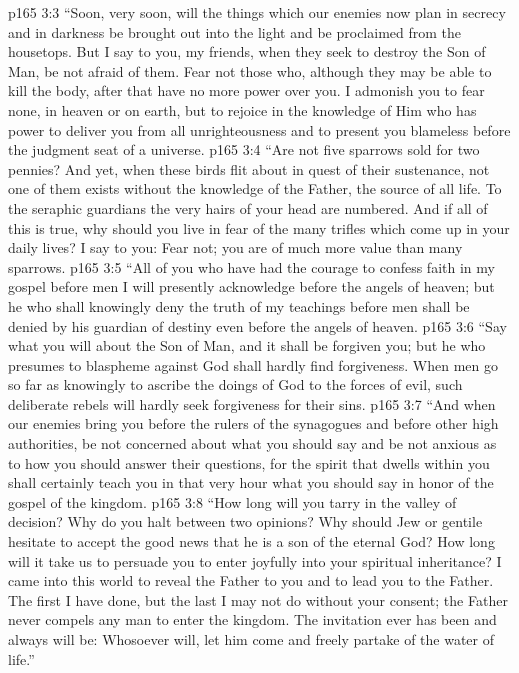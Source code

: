 \vs p165 3:3 \textcolor{ubdarkred}{“Soon, very soon, will the things which our enemies now plan in secrecy and in darkness be brought out into the light and be proclaimed from the housetops. But I say to you, my friends, when they seek to destroy the Son of Man, be not afraid of them. Fear not those who, although they may be able to kill the body, after that have no more power over you. I admonish you to fear none, in heaven or on earth, but to rejoice in the knowledge of Him who has power to deliver you from all unrighteousness and to present you blameless before the judgment seat of a universe.}
\vs p165 3:4 \textcolor{ubdarkred}{“Are not five sparrows sold for two pennies? And yet, when these birds flit about in quest of their sustenance, not one of them exists without the knowledge of the Father, the source of all life. To the seraphic guardians the very hairs of your head are numbered. And if all of this is true, why should you live in fear of the many trifles which come up in your daily lives? I say to you: Fear not; you are of much more value than many sparrows.}
\vs p165 3:5 \textcolor{ubdarkred}{“All of you who have had the courage to confess faith in my gospel before men I will presently acknowledge before the angels of heaven; but he who shall knowingly deny the truth of my teachings before men shall be denied by his guardian of destiny even before the angels of heaven.}
\vs p165 3:6 \textcolor{ubdarkred}{“Say what you will about the Son of Man, and it shall be forgiven you; but he who presumes to blaspheme against God shall hardly find forgiveness. When men go so far as knowingly to ascribe the doings of God to the forces of evil, such deliberate rebels will hardly seek forgiveness for their sins.}
\vs p165 3:7 \textcolor{ubdarkred}{“And when our enemies bring you before the rulers of the synagogues and before other high authorities, be not concerned about what you should say and be not anxious as to how you should answer their questions, for the spirit that dwells within you shall certainly teach you in that very hour what you should say in honor of the gospel of the kingdom.}
\vs p165 3:8 \textcolor{ubdarkred}{“How long will you tarry in the valley of decision? Why do you halt between two opinions? Why should Jew or gentile hesitate to accept the good news that he is a son of the eternal God? How long will it take us to persuade you to enter joyfully into your spiritual inheritance? I came into this world to reveal the Father to you and to lead you to the Father. The first I have done, but the last I may not do without your consent; the Father never compels any man to enter the kingdom. The invitation ever has been and always will be: Whosoever will, let him come and freely partake of the water of life.”}
